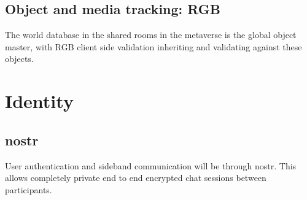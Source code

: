 \subsection{Object and media tracking: RGB}
The world database in the shared rooms in the metaverse is the global object master, with RGB client side validation inheriting and validating against these objects.\par





\section{Identity}
\subsection{nostr}
User authentication and sideband communication will be through nostr. This allows completely private end to end encrypted chat sessions between participants.
